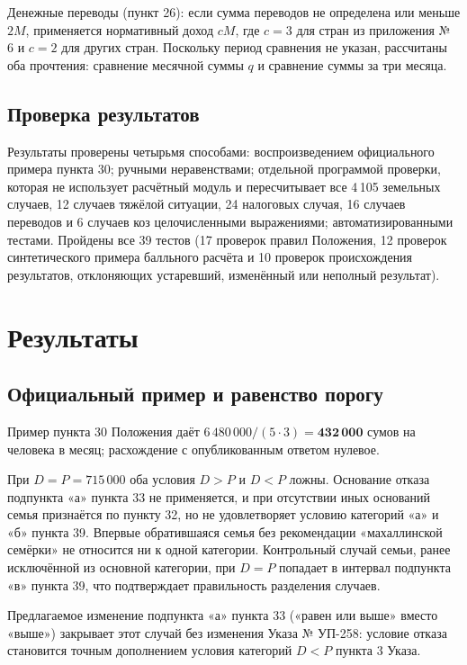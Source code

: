 \documentclass[12pt,a4paper]{extarticle}
\begin{document}
Денежные переводы (пункт 26): если сумма переводов не определена или меньше $2M$, применяется нормативный доход $cM$, где $c=3$ для стран из приложения № 6 и $c=2$ для других стран. Поскольку период сравнения не указан, рассчитаны оба прочтения: сравнение месячной суммы $q$ и сравнение суммы за три месяца.

\subsection{Проверка результатов}
Результаты проверены четырьмя способами: воспроизведением официального примера пункта 30; ручными неравенствами; отдельной программой проверки, которая не использует расчётный модуль и пересчитывает все 4\,105 земельных случаев, 12 случаев тяжёлой ситуации, 24 налоговых случая, 16 случаев переводов и 6 случаев коз целочисленными выражениями; автоматизированными тестами. Пройдены все 39 тестов (17 проверок правил Положения, 12 проверок синтетического примера балльного расчёта и 10 проверок происхождения результатов, отклоняющих устаревший, изменённый или неполный результат).

\section{Результаты}
\subsection{Официальный пример и равенство порогу}
Пример пункта 30 Положения даёт $6\,480\,000/(5\cdot3)=\mathbf{432\,000}$ сумов на человека в месяц; расхождение с опубликованным ответом нулевое.

При $D=P=715\,000$ оба условия $D>P$ и $D<P$ ложны. Основание отказа подпункта «а» пункта 33 не применяется, и при отсутствии иных оснований семья признаётся по пункту 32, но не удовлетворяет условию категорий «а» и «б» пункта 39. Впервые обратившаяся семья без рекомендации «махаллинской семёрки» не относится ни к одной категории. Контрольный случай семьи, ранее исключённой из основной категории, при $D=P$ попадает в интервал подпункта «в» пункта 39, что подтверждает правильность разделения случаев.

Предлагаемое изменение подпункта «а» пункта 33 («равен или выше» вместо «выше») закрывает этот случай без изменения Указа № УП-258: условие отказа становится точным дополнением условия категорий $D<P$ пункта 3 Указа.
\end{document}
